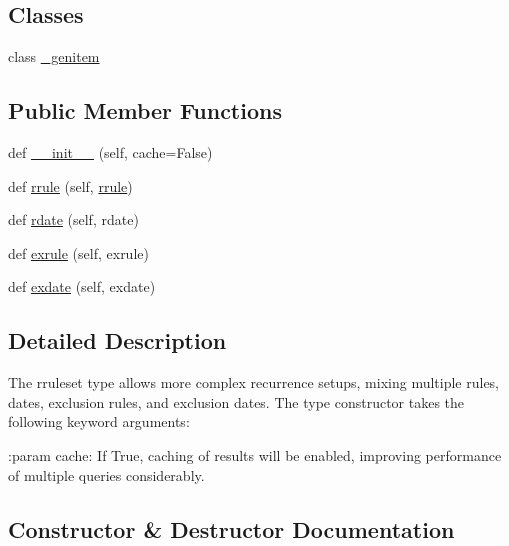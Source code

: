 \subsection*{Classes}
\begin{DoxyCompactItemize}
\item 
class \hyperlink{classdateutil_1_1rrule_1_1rruleset_1_1__genitem}{\+\_\+genitem}
\end{DoxyCompactItemize}
\subsection*{Public Member Functions}
\begin{DoxyCompactItemize}
\item 
def \hyperlink{classdateutil_1_1rrule_1_1rruleset_a4fa06d6953ecf56a37bc1847dd1b27af}{\+\_\+\+\_\+init\+\_\+\+\_\+} (self, cache=False)
\item 
def \hyperlink{classdateutil_1_1rrule_1_1rruleset_aeb2fa0bbb0410de7982b05ef805ff106}{rrule} (self, \hyperlink{classdateutil_1_1rrule_1_1rrule}{rrule})
\item 
def \hyperlink{classdateutil_1_1rrule_1_1rruleset_af980109179485ba7fd6e2a736206e3e1}{rdate} (self, rdate)
\item 
def \hyperlink{classdateutil_1_1rrule_1_1rruleset_abba38d9fb938ddaa7814df05e110ca9c}{exrule} (self, exrule)
\item 
def \hyperlink{classdateutil_1_1rrule_1_1rruleset_a434ff66add95e9a8f4c7480b574b3601}{exdate} (self, exdate)
\end{DoxyCompactItemize}


\subsection{Detailed Description}
\begin{DoxyVerb}The rruleset type allows more complex recurrence setups, mixing
multiple rules, dates, exclusion rules, and exclusion dates. The type
constructor takes the following keyword arguments:

:param cache: If True, caching of results will be enabled, improving
              performance of multiple queries considerably. \end{DoxyVerb}
 

\subsection{Constructor \& Destructor Documentation}
\mbox{\label{classdateutil_1_1rrule_1_1rruleset_a4fa06d6953ecf56a37bc1847dd1b27af}} 
